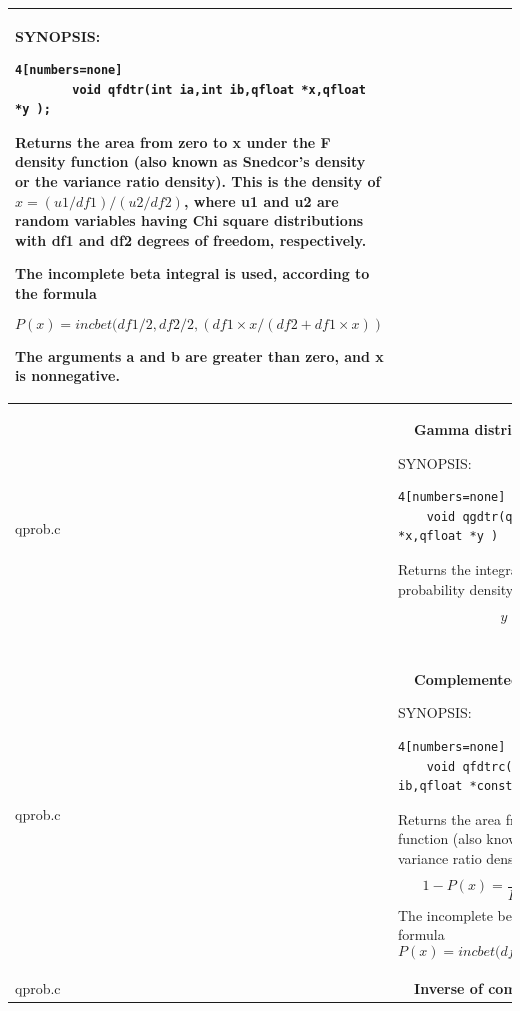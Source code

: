 \documentclass[10pt,a4paper,x11names]{memoir} %
\newcounter{entry}
\newcommand{\TOC}[1] {\addcontentsline{toc}{section}{\theentry\ \  #1} \textbf{\theentry\ \  #1} \par\stepcounter{entry}}
\begin{document}
\begin{longtable}{|p{1.5cm}|p{11.5cm}|}
	{\footnotesize SYNOPSIS:}\vspace{-0.2cm}\index{qfdtr}
	\begin{lstlisting}4[numbers=none]
		void qfdtr(int ia,int ib,qfloat *x,qfloat *y );
	\end{lstlisting}\vspace{-0.2cm}
	
	
	Returns the area from zero to x under the F density
	function (also known as Snedcor's density or the
	variance ratio density).  This is the density
	of $x = (u1/df1)/(u2/df2)$, where u1 and u2 are random
	variables having Chi square distributions with df1
	and df2 degrees of freedom, respectively.
	
	The incomplete beta integral is used, according to the
	formula
	
	$$P(x) = incbet( df1/2, df2/2, (df1\times x/(df2 + df1\times x) )$$
	
	
	The arguments a and b are greater than zero, and x is
	nonnegative.
	\\\hline
	qprob.c&
	\TOC{Gamma distribution function} 
	
	{\footnotesize SYNOPSIS:}\vspace{-0.2cm}\index{qgdtr}
\begin{lstlisting}4[numbers=none]
	void qgdtr(qfloat *a,qfloat *b,qfloat *x,qfloat *y )
	\end{lstlisting}\vspace{-0.2cm}
	
	Returns the integral from zero to x of the gamma probability
	density function:
	$$ y = \frac{a^b}{\Gamma b}\int_{0}^{x}t^{b-1}\ e^{-at}\ dt$$
	\\\hline
	qprob.c&
	\TOC{Complemented F distribution}
	
	{\footnotesize SYNOPSIS:}\vspace{-0.2cm}\index{qfdtrc}
	\begin{lstlisting}4[numbers=none]
	void qfdtrc(const int ia,const int ib,qfloat *const x, qfloat *y)
	\end{lstlisting}\vspace{-0.2cm}
	
	Returns the area from x to infinity under the F density
	function (also known as Snedcor's density or the
	variance ratio density).
	$$ 1-P(x)=\frac{1}{B(a,b)} \int_{x}^{\infty}t^{a-1}\ (1-t)^{b-1}\ dt$$
	The incomplete beta integral is used, according to the
	formula
	$$P(x) = incbet( df2/2, df1/2, (df2/(df2 + df1*x) )$$
	\\\hline
	qprob.c&	\TOC{Inverse of complemented F distribution}
	

\end{longtable}
\end{document}

